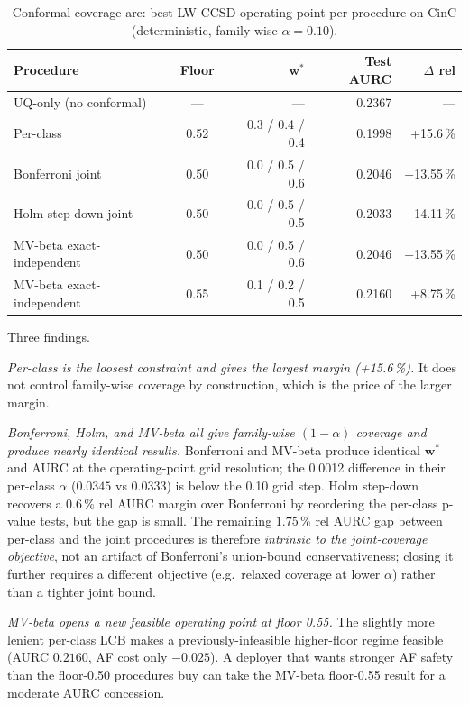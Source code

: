 \documentclass[journal]{IEEEtran}
\begin{document}
\begin{table}[!t]
\centering
\caption{Conformal coverage arc: best LW-CCSD operating point per procedure on CinC (deterministic, family-wise $\alpha=0.10$).}
\label{tab:conformal_arc}
\begin{tabular}{lcrrr}
\toprule
Procedure & Floor & $\mathbf{w}^{*}$ & Test AURC & $\Delta$ rel \\
\midrule
UQ-only (no conformal)       & ---  & ---             & 0.2367 & --- \\
Per-class                    & 0.52 & 0.3 / 0.4 / 0.4 & 0.1998 & +15.6\,\% \\
Bonferroni joint             & 0.50 & 0.0 / 0.5 / 0.6 & 0.2046 & +13.55\,\% \\
Holm step-down joint         & 0.50 & 0.0 / 0.5 / 0.5 & 0.2033 & +14.11\,\% \\
MV-beta exact-independent    & 0.50 & 0.0 / 0.5 / 0.6 & 0.2046 & +13.55\,\% \\
MV-beta exact-independent    & 0.55 & 0.1 / 0.2 / 0.5 & 0.2160 & +8.75\,\% \\
\bottomrule
\end{tabular}
\end{table}

Three findings.

\emph{Per-class is the loosest constraint and gives the largest margin (+15.6\,\%).} It does not control family-wise coverage by construction, which is the price of the larger margin.

\emph{Bonferroni, Holm, and MV-beta all give family-wise $(1-\alpha)$ coverage and produce nearly identical results.} Bonferroni and MV-beta produce identical $\mathbf{w}^{*}$ and AURC at the operating-point grid resolution; the 0.0012 difference in their per-class $\alpha$ ($0.0345$ vs $0.0333$) is below the 0.10 grid step. Holm step-down recovers a $0.6\,\%$ rel AURC margin over Bonferroni by reordering the per-class p-value tests, but the gap is small. The remaining $1.75\,\%$ rel AURC gap between per-class and the joint procedures is therefore \emph{intrinsic to the joint-coverage objective}, not an artifact of Bonferroni's union-bound conservativeness; closing it further requires a different objective (e.g.\ relaxed coverage at lower $\alpha$) rather than a tighter joint bound.

\emph{MV-beta opens a new feasible operating point at floor 0.55.} The slightly more lenient per-class LCB makes a previously-infeasible higher-floor regime feasible (AURC $0.2160$, AF cost only $-0.025$). A deployer that wants stronger AF safety than the floor-0.50 procedures buy can take the MV-beta floor-0.55 result for a moderate AURC concession.
\end{document}
